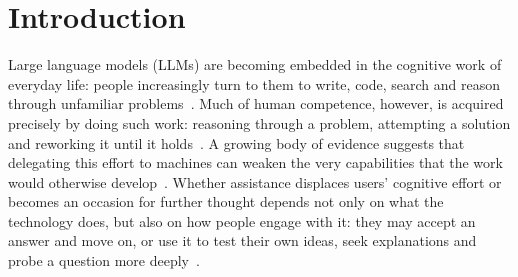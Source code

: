 \section{Introduction}\label{sec1}


Large language models (LLMs) are becoming embedded in the cognitive work of everyday life: people increasingly turn to them to write, code, search and reason through unfamiliar problems~\cite{chatterji2025people,noy2023experimental,brynjolfsson2025generative,costaGomes2026healthqueries}. Much of human competence, however, is acquired precisely by doing such work: reasoning through a problem, attempting a solution and reworking it until it holds~\cite{anzai1979theory,kolb2014experiential}. A growing body of evidence suggests that delegating this effort to machines can weaken the very capabilities that the work would otherwise develop~\cite{risko2016cognitive,gerlich2025ai}. Whether assistance displaces users' cognitive effort or becomes an occasion for further thought depends not only on what the technology does, but also on how people engage with it: they may accept an answer and move on, or use it to test their own ideas, seek explanations and probe a question more deeply~\cite{barke2023grounded,kobiella2024if}. 

